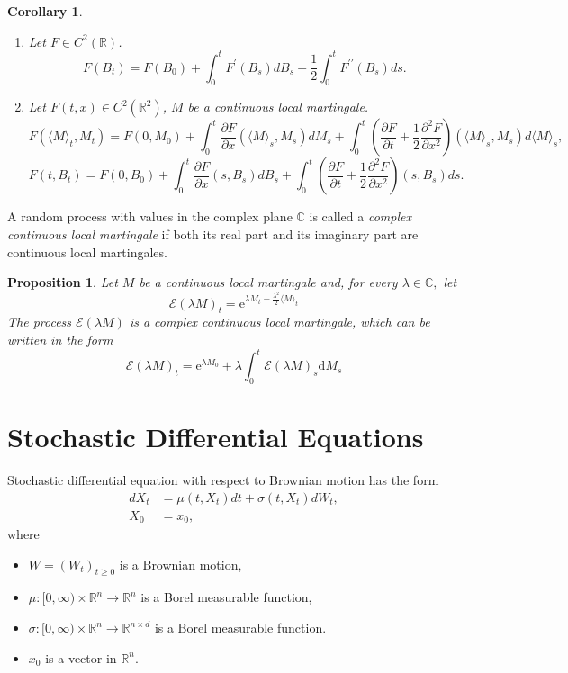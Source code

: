 \documentclass{report}
\newtheorem{proposition}{Proposition}[section]
\newtheorem{corollary}{Corollary}[section]
\theoremstyle{nonumberplain}
\begin{document}
\begin{corollary}
	\begin{enumerate}
		\item Let $F\in C^2(\mathbb{R})$.
		$$F\left(B_{t}\right)=F\left(B_{0}\right)+\int_{0}^{t} F^{\prime}\left(B_{s}\right) d B_{s}+\frac{1}{2} \int_{0}^{t} F^{\prime \prime}\left(B_{s}\right) d s.$$
		\item Let $F(t,x)\in C^2(\mathbb{R}^2)$, $M$ be a continuous local martingale.
		\[
		F\left(\langle M\rangle_{t}, M_{t}\right)=F\left(0, M_{0}\right)+\int_{0}^{t} \frac{\partial F}{\partial x}\left(\langle M\rangle_{s}, M_{s}\right) d M_{s}+\int_{0}^{t}\left(\frac{\partial F}{\partial t}+\frac{1}{2} \frac{\partial^{2} F}{\partial x^{2}}\right)\left(\langle M\rangle_{s}, M_{s}\right) d \langle M\rangle_{s},
		\]
		\[
		F\left(t, B_{t}\right)=F\left(0, B_{0}\right)+\int_{0}^{t} \frac{\partial F}{\partial x}\left(s, B_{s}\right) d B_{s}+\int_{0}^{t}\left(\frac{\partial F}{\partial t}+\frac{1}{2} \frac{\partial^{2} F}{\partial x^{2}}\right)\left(s, B_{s}\right) d s.
		\]
	\end{enumerate}
	
	
\end{corollary}

A random process with values in the complex plane $\mathbb{C}$ is called a \emph{complex continuous local martingale} if both its real part and its imaginary part are continuous local martingales.

\begin{proposition}
	Let $M$ be a continuous local martingale and, for every $\lambda \in \mathbb{C},$ let
	\[
	\mathcal{E}(\lambda M)_{t}=\mathrm{e}^{\lambda M_{t}-\tfrac{\lambda^{2}}{2}\langle M\rangle_{t}}
	\]
	The process $\mathcal{E}(\lambda M)$ is a complex continuous local martingale, which can be written
	in the form
	\[
	\mathcal{E}(\lambda M)_{t}=\mathrm{e}^{\lambda M_{0}}+\lambda \int_{0}^{t} \mathcal{E}(\lambda M)_{s} \mathrm{d} M_{s}
	\]
\end{proposition}

\chapter{Stochastic Differential Equations}
Stochastic differential equation with respect to Brownian motion has the form
$$
\begin{aligned}
d X_t &=\mu\left(t, X_t\right) d t+\sigma\left(t, X_t\right) d W_t, \\
X_0 &=x_0,
\end{aligned}
$$
where
\begin{itemize}
	\item $W=\left(W_t\right)_{t\ge 0}$ is a Brownian motion,
	\item $\mu: [0,\infty) \times \mathbb{R}^n \rightarrow \mathbb{R}^n$ is a Borel measurable function,
	\item $\sigma: [0,\infty) \times \mathbb{R}^n \rightarrow \mathbb{R}^{n\times d}$ is a Borel measurable function.
	\item $x_0$ is a vector in $\mathbb{R}^n$.
\end{itemize}
\end{document}
